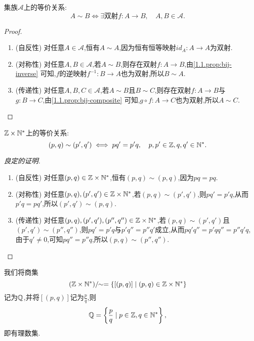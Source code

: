
\begin{example}
    集族$\mathcal{A}$上的等价关系:$$A \sim B \iff \exists \text{双射} f:A \to B, \quad A,B \in \mathcal{A}.$$

    \begin{proof}
        \begin{enumerate}[(1)]
            \item (自反性) 对任意$A \in \mathcal{A}$,恒有$A \sim A$,因为恒有恒等映射$id_A:A \to A$为双射.
            \item (对称性) 对任意$A,B \in \mathcal {A}$,若$A \sim B$,则存在双射$f:A \to B$,由\autoref{1.1.prop:bij-inverse} 可知,$f$的逆映射$f^{-1}:B \to A$也为双射,所以$B \sim A$.
            \item (传递性) 对任意$A,B,C \in \mathcal {A}$,若$A \sim B$且$B \sim C$,则存在双射$f:A \to B$与$g:B \to C$,由\autoref{1.1.prop:bij-composite} 可知,$g \circ f:A \to C$也为双射,所以$A \sim C$.
        \end{enumerate}
    \end{proof}
\end{example}

\begin{example}
    $\mathbb{Z} \times \mathbb{N}^*$上的等价关系: $$(p,q) \sim (p',q') \iff pq' = p'q, \quad p,p' \in \mathbb{Z}, q,q' \in \mathbb{N}^*.$$

    \begin{proof}
        [良定的证明]
        \begin{enumerate}[(1)]
            \item (自反性) 对任意$(p,q) \in \mathbb{Z} \times \mathbb{N}^*$,恒有$(p,q) \sim (p,q)$,因为$pq = pq$.
            \item (对称性) 对任意$(p,q),(p',q') \in \mathbb{Z} \times \mathbb{N}^*$,若$(p,q) \sim (p',q')$,则$ pq' = p'q$,从而$p'q = pq'$,所以$(p',q') \sim (p,q)$.
            \item (传递性) 对任意$(p,q),(p',q'),(p'',q'') \in \mathbb{Z} \times \mathbb{N}^*$,若$(p,q) \sim (p',q')$且$(p',q') \sim (p'',q'')$,则$ pq' = p'q$与$p'q'' = p''q'$成立,从而$ pq'q'' = p'q q'' = p''q'q$,由于$q' \neq 0$,可知$ pq'' = p''q$,所以$(p,q) \sim (p'',q'')$.
        \end{enumerate}
    \end{proof}
\end{example}

我们将商集$$(\mathbb{Z} \times \mathbb{N}^*)\mathbin{/}\!\!\sim = \{ [(p,q)] \mid (p,q) \in \mathbb{Z} \times \mathbb{N}^* \}$$记为$\mathbb{Q}$,并将$[(p,q)]$记为$\frac{p}{q}$,则$$\mathbb{Q} = \left\{ \frac{p}{q} \mid p \in \mathbb{Z}, q \in \mathbb{N}^* \right\},$$即有理数集.

